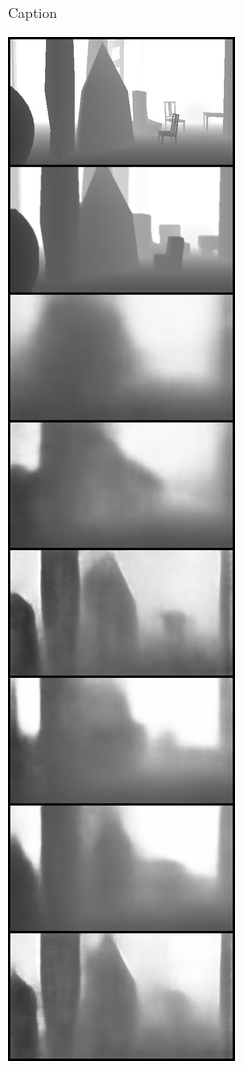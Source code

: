 \begin{figure}[htb]
\begin{subfigure}[b]{0.3\textwidth}
        \caption{Caption}
        \label{fig:the_same_4}
    \end{subfigure} 
    \hfill
    \begin{subfigure}[b]{0.3\textwidth}
        \centering
        \includegraphics[height=\textheight]{figures/8_/the_same_8.jpg}

\end{subfigure}
\end{figure}
